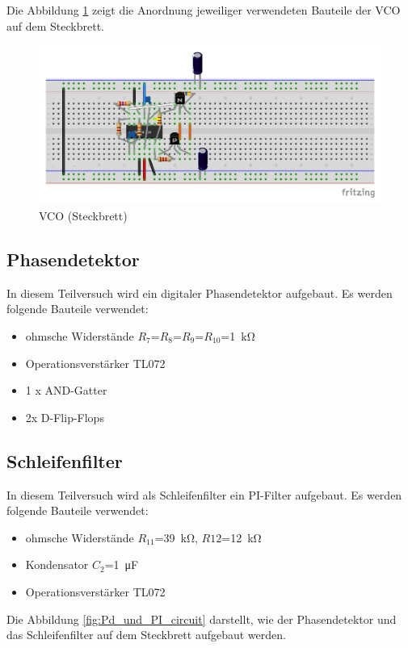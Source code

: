 Die Abbildung \ref{fig:VCO_circuit} zeigt die Anordnung jeweiliger verwendeten Bauteile der VCO auf dem Steckbrett.

\begin{figure}[H]
  \centering
  \includegraphics[width=0.6\linewidth]{Elektronik-Laborprotokoll_PLL/circuits/VCO_circuit.pdf}
  \caption{VCO (Steckbrett)}
  \label{fig:VCO_circuit}
\end{figure}



\subsection{Phasendetektor}


In diesem Teilversuch wird ein digitaler Phasendetektor aufgebaut.
Es werden folgende Bauteile verwendet:
%
\begin{itemize}
    \item ohmsche Widerstände $R_7$=$R_8$=$R_9$=$R_{10}$=\SI{1}{\kilo\ohm}
    \item Operationsverstärker TL072
    \item 1 x AND-Gatter
    \item 2x D-Flip-Flops
\end{itemize}

\subsection{Schleifenfilter}

In diesem Teilversuch wird als Schleifenfilter ein PI-Filter aufgebaut.
Es werden folgende Bauteile verwendet:

\begin{itemize}
    \item ohmsche Widerstände $R_{11}$=\SI{39}{\kilo\ohm}, $R{12}$=\SI{12}{\kilo\ohm}
    \item  Kondensator $C_2$=\SI{1}{\micro\farad}
    \item Operationsverstärker TL072
\end{itemize}

Die Abbildung \ref{fig:Pd_und_PI_circuit} darstellt, wie der Phasendetektor und das Schleifenfilter auf dem Steckbrett aufgebaut werden.

